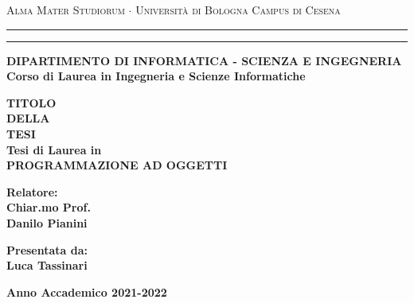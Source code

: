 \begin{titlepage}
    \begin{center}
        {
            {\Large
                {\textsc{
                    Alma Mater Studiorum $\cdot$ Università di Bologna
                }}
                {\textsc{
                    Campus di Cesena
                }}
            }
        }
        \rule[0.1cm]{15.8cm}{0.1mm}
        \rule[0.5cm]{15.8cm}{0.6mm}
        {\small
            {\bf 
                DIPARTIMENTO DI INFORMATICA - SCIENZA E INGEGNERIA\\
                Corso di Laurea in Ingegneria e Scienze Informatiche
            }
        }
        \end{center}
        \vspace{15mm}
        \begin{center}
            {\LARGE{\bf TITOLO}}\\
            \vspace{3mm}
            {\LARGE{\bf DELLA}}\\
            \vspace{3mm}
            {\LARGE{\bf TESI}}\\
            \vspace{19mm}
            {\large
                {\bf
                    Tesi di Laurea in \\
                    PROGRAMMAZIONE AD OGGETTI
                }
            }
        \end{center}
        \vspace{40mm}
        \par
        \noindent
        \begin{minipage}[t]{0.47\textwidth}
            {\large
                {\bf
                    Relatore:\\
                    Chiar.mo Prof.\\
                    Danilo Pianini
                }
            }
        \end{minipage}
        \hfill
        \begin{minipage}[t]{0.47\textwidth}\raggedleft
            {\large
                {\bf 
                    Presentata da:\\
                    Luca Tassinari
                }
            }
        \end{minipage}
        \vspace{30mm}
        \begin{center}
        {\large
            {\bf 
                Anno Accademico 2021-2022
            }
        }
    \end{center}
\end{titlepage}